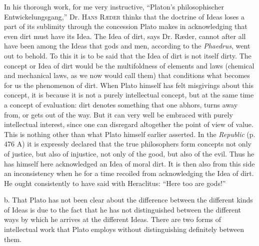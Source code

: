\documentclass[12pt,a4paper,openany]{book}
\newcommand{\opage}[1]{\marginnote{\footnotesize\textit{[#1]}}}
\begin{document}
In his thorough work, for me very instructive, ``Platon’s
philosophischer Entwickelungsgang,'' Dr. \textsc{Hans}
\textsc{Ræder} thinks that the doctrine of Ideas loses a part of its sublimity through
the concession Plato makes in acknowledging that even
dirt must have its Idea. The Idea of dirt, says Dr.
Ræder, cannot after all have been among the Ideas that
gods and men, according to the \textit{Phaedrus}, went out to behold.
To this it is to be said that the Idea of dirt is not itself dirty.
The concept or Idea of dirt would be the multifoldness of
elements and laws (chemical and mechanical laws, as we now
would call them) that conditions what becomes for us
\setcounter{footnote}{0}%
\opage{11}the phenomenon of dirt. When Plato himself has felt misgivings
about this concept, it is because it is not a purely
intellectual concept, but at the same time a concept of evaluation: dirt
denotes something that one abhors, turns away from, or
gets out of the way. But it can very well be embraced with purely
intellectual interest, since one can disregard altogether the point of view of value.
This is nothing other than what Plato himself earlier
asserted. In the \textit{Republic} (p. 476 A) it is expressly declared
that the true philosophers form concepts not only
of justice, but also of injustice, not only
of the good, but also of the evil. Thus he has
himself here acknowledged an Idea of moral dirt. It
is then also from this side an inconsistency when he
for a time recoiled from acknowledging the Idea of dirt.
He ought consistently to have said with Heraclitus: ``Here too
are gods!''

b. That Plato has not been clear about the difference
between the different kinds of Ideas is due to the fact that
he has not distinguished between the different ways by which
he arrives at the different Ideas. There are two forms of
intellectual work that Plato employs without distinguishing definitely
between them.
\end{document}
